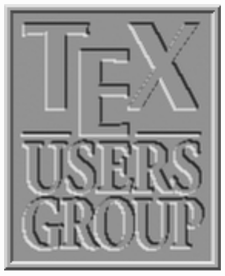 \documentclass{article}
\theoremstyle{definition}
\theoremstyle{remark}
\theoremstyle{plain}
\numberwithin{equation}{subsection}
\begin{document}
{\begin{figure}[htbp]
{\begin{minipage}[b]{0.2\textwidth}
			\includegraphics[width=1\textwidth]{picture/tex2.png}
		\end{minipage}
	}
\end{figure}}
\end{document}
